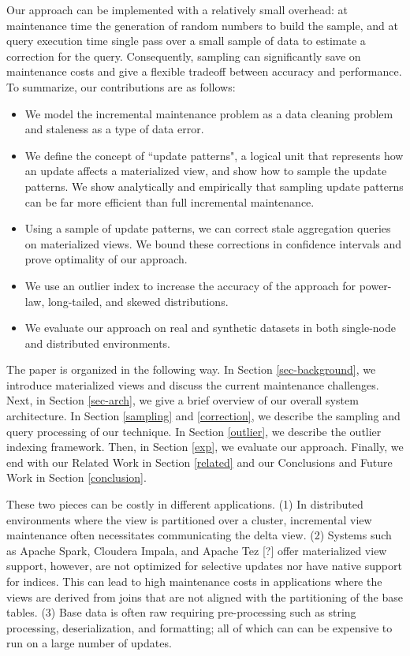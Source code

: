 Our approach can be implemented with a relatively small overhead: at maintenance time the generation of random numbers to build the sample, and at query execution time single pass over a small sample of data to estimate a correction for the query.
Consequently, sampling can significantly save on maintenance costs and give a flexible tradeoff between accuracy and performance.
To summarize, our contributions are as follows:
\begin{itemize}
  \item We model the incremental maintenance problem as a data cleaning problem and staleness as a type of data error.
  \item We define the concept of ``update patterns", a logical unit that represents how an update affects a materialized view, and show how to sample the update patterns. We show analytically and empirically that sampling update patterns can be far more efficient than full incremental maintenance.
  \item Using a sample of update patterns, we can correct stale aggregation queries on materialized views. We bound these corrections in confidence intervals and prove optimality of our approach.
  \item We use an outlier index to increase the accuracy of the approach for power-law, long-tailed, and skewed distributions.
  \item We evaluate our approach on real and synthetic datasets in both single-node and distributed environments.
\end{itemize}

The paper is organized in the following way. 
In Section \ref{sec-background}, we introduce materialized views and discuss the current maintenance challenges.
Next, in Section \ref{sec-arch}, we give a brief overview of our overall system architecture.
In Section \ref{sampling} and \ref{correction}, we describe the sampling and query processing of our technique.
In Section \ref{outlier}, we describe the outlier indexing framework.
Then, in Section \ref{exp}, we evaluate our approach.
Finally, we end with our Related Work in Section \ref{related} and our Conclusions and Future Work in Section \ref{conclusion}.

\iffalse
 These two pieces can be costly in different
applications. (1) In distributed environments where the view is partitioned
over a cluster, incremental view maintenance often necessitates communicating
the delta view. (2) Systems such as Apache Spark, Cloudera Impala,
and Apache Tez {[}?{]} offer materialized view support, however, are
not optimized for selective updates nor have native support for indices.
This can lead to high maintenance costs in applications where the
views are derived from joins that are not aligned with the partitioning
of the base tables. (3) Base data is often raw requiring pre-processing
such as string processing, deserialization, and formatting; all of
which can can be expensive to run on a large number of updates. 



